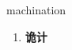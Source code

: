 
\begin{frame}
{\huge machination}
\begin{center}
\begin{enumerate}\Large
  \item \textbf{诡计}
\end{enumerate}
\end{center}
\end{frame}
